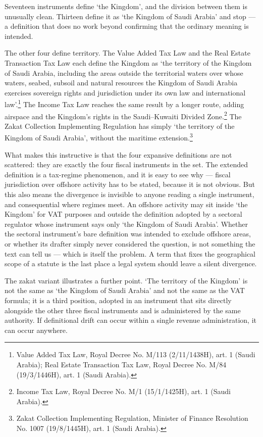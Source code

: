 \documentclass[11pt]{article}
\begin{document}
Seventeen instruments define `the Kingdom', and the division between them is
unusually clean. Thirteen define it as `the Kingdom of Saudi Arabia' and stop
--- a definition that does no work beyond confirming that the ordinary
meaning is intended.

The other four define territory. The Value Added Tax Law and the Real Estate
Transaction Tax Law each define the Kingdom as `the territory of the Kingdom
of Saudi Arabia, including the areas outside the territorial waters over
whose waters, seabed, subsoil and natural resources the Kingdom of Saudi
Arabia exercises sovereign rights and jurisdiction under its own law and
international law'.\footnote{Value Added Tax Law, Royal Decree No. M/113 (2/11/1438H), art. 1 (Saudi Arabia); Real Estate Transaction Tax Law, Royal Decree No. M/84 (19/3/1446H), art. 1 (Saudi Arabia).} The Income Tax Law reaches the same result by a longer
route, adding airspace and the Kingdom's rights in the Saudi--Kuwaiti Divided
Zone.\footnote{Income Tax Law, Royal Decree No. M/1 (15/1/1425H), art. 1 (Saudi Arabia).} The
Zakat Collection Implementing Regulation has simply `the territory of the
Kingdom of Saudi Arabia', without the maritime extension.\footnote{Zakat Collection Implementing Regulation, Minister of Finance Resolution No. 1007 (19/8/1445H), art. 1 (Saudi Arabia).}

What makes this instructive is that the four expansive definitions are not
scattered: they are exactly the four fiscal instruments in the set. The
extended definition is a tax-regime phenomenon, and it is easy to see why ---
fiscal jurisdiction over offshore activity has to be stated, because it is
not obvious. But this also means the divergence is invisible to anyone
reading a single instrument, and consequential where regimes meet. An
offshore activity may sit inside `the Kingdom' for VAT purposes and outside
the definition adopted by a sectoral regulator whose instrument says only
`the Kingdom of Saudi Arabia'. Whether the sectoral instrument's bare
definition was intended to exclude offshore areas, or whether its drafter
simply never considered the question, is not something the text can tell us
--- which is itself the problem. A term that fixes the geographical scope of
a statute is the last place a legal system should leave a silent divergence.

The zakat variant illustrates a further point. `The territory of the Kingdom'
is not the same as `the Kingdom of Saudi Arabia' and not the same as the VAT
formula; it is a third position, adopted in an instrument that sits directly
alongside the other three fiscal instruments and is administered by the same
authority. If definitional drift can occur within a single revenue
administration, it can occur anywhere.
\end{document}
